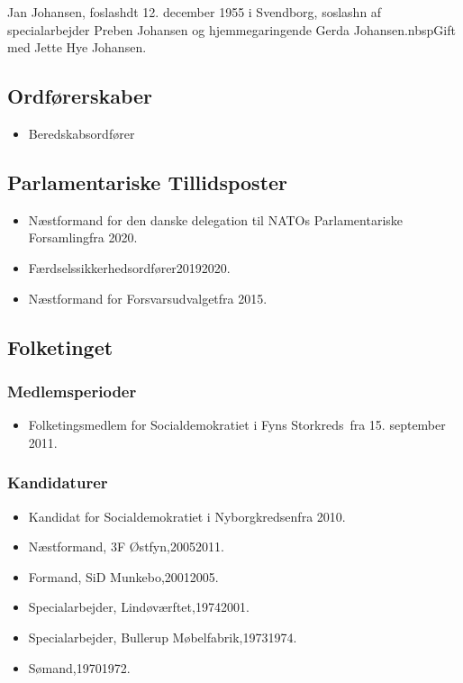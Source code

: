 \documentclass[11pt, a4paper]{awesome-cv}
\begin{document}
\makecvheader[R]
\makelettertitle
\begin{cvletter}
Jan Johansen, foslashdt 12. december 1955 i Svendborg, soslashn af specialarbejder Preben Johansen og hjemmegaringende Gerda Johansen.nbspGift med Jette Hye Johansen.

\subsection*{Ordførerskaber}
\begin{itemize}
\item Beredskabsordfører
\end{itemize}
\subsection*{Parlamentariske Tillidsposter}
\begin{itemize}
\item Næstformand for den danske delegation til NATOs Parlamentariske Forsamlingfra 2020.
\item Færdselssikkerhedsordfører20192020.
\item Næstformand for Forsvarsudvalgetfra 2015.
\end{itemize}
\subsection*{Folketinget}
\subsubsection*{Medlemsperioder}
\begin{itemize}
\item Folketingsmedlem for Socialdemokratiet i Fyns Storkreds fra 15. september 2011.
\end{itemize}
\subsubsection*{Kandidaturer}
\begin{itemize}
\item Kandidat for Socialdemokratiet i Nyborgkredsenfra 2010.
\end{itemize}
\begin{itemize}
\item Næstformand, 3F Østfyn,20052011.
\item Formand, SiD Munkebo,20012005.
\item Specialarbejder, Lindøværftet,19742001.
\item Specialarbejder, Bullerup Møbelfabrik,19731974.
\item Sømand,19701972.
\end{itemize}
\end{cvletter}
\end{document}
